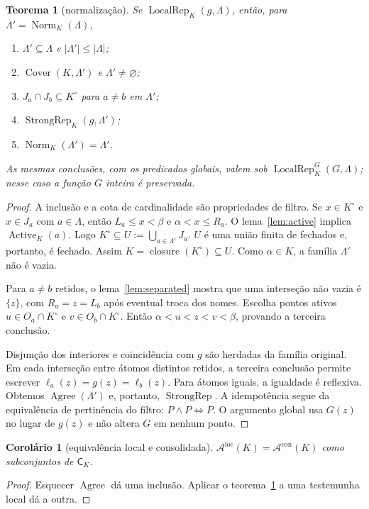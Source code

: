 \documentclass[11pt,a4paper]{article}
\newtheorem{teorema}[definicao]{Teorema}
\newtheorem{corolario}[definicao]{Corolário}
\newcommand{\CK}{\mathsf C_K}
\newcommand{\Norm}{\operatorname{Norm}}
\newcommand{\Act}{\operatorname{Active}}
\newcommand{\Cov}{\operatorname{Cover}}
\newcommand{\Agree}{\operatorname{Agree}}
\newcommand{\Loc}{\operatorname{LocalRep}}
\newcommand{\Str}{\operatorname{StrongRep}}
\newcommand{\Aloc}{\mathcal A^{\mathrm{loc}}}
\newcommand{\Astr}{\mathcal A^{\mathrm{con}}}
\newcommand{\cls}{\operatorname{closure}}
\begin{document}
\begin{teorema}[normalização]\label{thm:norm}
Se $\Loc_K(g,\Lambda)$, então, para $\Lambda'=\Norm_K(\Lambda)$,
\begin{enumerate}
\item $\Lambda'\subseteq\Lambda$ e $|\Lambda'|\le|\Lambda|$;
\item $\Cov(K,\Lambda')$ e $\Lambda'\ne\varnothing$;
\item $J_a\cap J_b\subseteq K^\circ$ para $a\ne b$ em $\Lambda'$;
\item $\Str_K(g,\Lambda')$;
\item $\Norm_K(\Lambda')=\Lambda'$.
\end{enumerate}
As mesmas conclusões, com os predicados globais, valem sob
$\Loc^G_K(G,\Lambda)$; nesse caso a função $G$ inteira é preservada.
\end{teorema}
\begin{proof}
A inclusão e a cota de cardinalidade são propriedades de filtro.
Se $x\in K^\circ$ e $x\in J_a$ com $a\in\Lambda$, então
$L_a\le x<\beta$ e $\alpha<x\le R_a$. O
lema~\ref{lem:active} implica $\Act_K(a)$. Logo
$K^\circ\subseteq U:=\bigcup_{a\in\Lambda'}J_a$.
$U$ é uma união finita de fechados e, portanto, é fechado.
Assim $K=\cls(K^\circ)\subseteq U$. Como $\alpha\in K$,
a família $\Lambda'$ não é vazia.

Para $a\ne b$ retidos, o lema~\ref{lem:separated} mostra que
uma interseção não vazia é $\{z\}$, com
$R_a=z=L_b$ após eventual troca dos nomes. Escolha pontos ativos
$u\in O_a\cap K^\circ$ e $v\in O_b\cap K^\circ$. Então
$\alpha<u<z<v<\beta$, provando a terceira conclusão.

Disjunção dos interiores e coincidência com $g$ são herdadas da
família original. Em cada interseção entre átomos distintos retidos,
a terceira conclusão permite escrever
$\ell_a(z)=g(z)=\ell_b(z)$. Para átomos iguais, a igualdade é
reflexiva. Obtemos $\Agree(\Lambda')$ e, portanto, $\Str$.
A idempotência segue da equivalência de pertinência do filtro:
$P\land P\Longleftrightarrow P$. O argumento global usa
$G(z)$ no lugar de $g(z)$ e não altera $G$ em nenhum ponto.
\end{proof}

\begin{corolario}[equivalência local e consolidada]\label{cor:classes}
$\Aloc(K)=\Astr(K)$ como subconjuntos de $\CK$.
\end{corolario}
\begin{proof}
Esquecer $\Agree$ dá uma inclusão. Aplicar o
teorema~\ref{thm:norm} a uma testemunha local dá a outra.
\end{proof}
\end{document}
